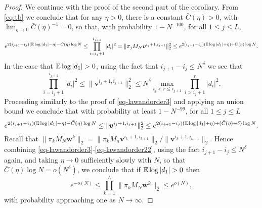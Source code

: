 \documentclass{amsart}
\numberwithin{equation}{section}
\def\corAB{}
\def\corOZ{}
\begin{document}
\begin{proof}
 \corOZ{We continue with the proof of the second
 part of the corollary.
 From \eqref{eq:tb}}
 we conclude that for any $\eta > 0$,
  there is a constant $\bar{C}(\eta)>0$, \corAB{with $\lim_{\eta \to 0} \bar{C}(\eta)^{-1}=0$}, so that,
  with probability $1-N^{-100}$,
  for all $1 \leq j \leq L$,
  \begin{equation}
    \label{eq-lawandorder3}
    e^{2(i_{j+1}-i_j)(\mathbb{E} \log |d_1|- \eta)-\bar{C}(\eta) \log N}
    \leq
    \prod_{i=i_j+1}^{i_{j+1}}
    |d_i|^2
    =
    \|\pi_j M_N {\bm v}^{i_j+1,i_{j+1}}\|^2_2\leq
    e^{2(i_{j+1}-i_j)(\mathbb{E} \log |d_1|+ \eta)+\bar{C}(\eta) \log N}.
  \end{equation}
In the case that $\mathbb{E} \log |d_1| > 0$, \corAB{using the fact that $i_{j+1} - i_j \le N^\delta$ we see that}
  \[
    \prod_{i=i_j+1}^{i_{{j+1}}} |d_i|^2
    \leq \|{\bm v}^{i_j+1,i_{j+1}}\|^2_2
    \leq N^{\delta} \max_{i_j < r \leq i_{j+1}} \prod_{i>i_j+1}^{r} |d_i|^2.
  \]
  \corAB{Proceeding similarly} \corOZ{to the proof of \eqref{eq-lawandorder3}
and applying an union bound} we conclude that with probability at least \corAB{$1-N^{-99}$},
  for all $1 \leq j \leq L$
  \begin{equation}
    \label{eq-lawandorder22}
    e^{2(i_{j+1}-i_j)(\Exp \log|d_1|-\eta)-\corAB{\bar{C}(\eta)}\log N}
    \leq
    \|{\bm v}^{i_j+1,i_{j+1}}\|^2_2
    \leq
    e^{2(i_{j+1}-i_j)(\Exp \log|d_1|+\eta)+\corAB{(\bar{C}(\eta)+\delta)}\log N}.
  \end{equation}
 Recall that
 $ \|\pi_k M_N {\bm w}^{k}\|_2=\|\pi_k M_n {\bm v}^{i_k+1,i_{k+1}}\|_2/
    \|{\bm v}^{i_k+1,i_{k+1}}\|_2$.
    \corAB{Hence combining \eqref{eq-lawandorder3}-\eqref{eq-lawandorder22}, using the fact $i_{j+1} - i_j \le N^\delta$ again, and taking $\eta \to 0$ sufficiently slowly with $N$, so that $\bar{C}(\eta) \log N = o(N^\delta)$, we}
  conclude that  if $\E\log |d_1|>0$ then
  \begin{equation}
    \label{eq-lawandorder1}
    e^{-o(N)}
    \leq
    \prod_{k=1}^L \|\pi_k M_N {\bm w}^{k}\|_2
    \leq
    e^{o(N)},
  \end{equation}
  \corAB{with probability} \corOZ{approaching} \corAB{one as $N \to \infty$.}




\end{proof}
\end{document}
